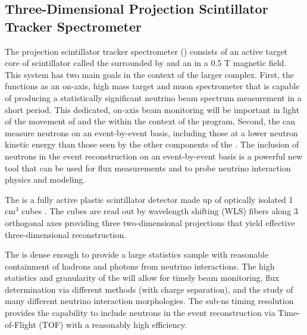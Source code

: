 \subsection{Three-Dimensional Projection Scintillator Tracker Spectrometer}
\label{sec:appx-nd:mpt-3dst}

The \threed projection scintillator tracker spectrometer () consists of an active target core of scintillator called the  surrounded by  and an  in a 0.5 T magnetic field.  This system has two main goals in the context of the larger  complex.  First, the  functions as an on-axis, high mass target and muon spectrometer that is capable of producing a statistically significant neutrino beam spectrum measurement in a short period.  This dedicated, on-axis beam monitoring will be important in light of the movement of  and the  within the context of the  program.  Second, the  can measure neutrons on an event-by-event basis, including those at a lower neutron kinetic energy than those seen by the other components of the .  The inclusion of neutrons in the event reconstruction on an event-by-event basis is a powerful new tool that can be used for flux measurements and to probe neutrino interaction physics and modeling.



The  is a fully active plastic scintillator detector made up of optically isolated 1 cm$^{3}$ cubes \cite{Sgalaberna:2017khy}.  The cubes are read out by wavelength shifting (WLS) fibers along 3 orthogonal axes providing three two-dimensional projections that yield effective three-dimensional reconstruction.  


The  is dense enough to provide a large statistics sample with reasonable containment of hadrons and photons from neutrino interactions. The high statistics and granularity  of the  will allow for timely beam monitoring, flux determination via different methods (with charge separation), and the study of many different neutrino interaction morphologies.  The sub-ns timing resolution provides the  capability to include neutrons in the event reconstruction via Time-of-Flight (TOF) with a reasonably high efficiency.  

